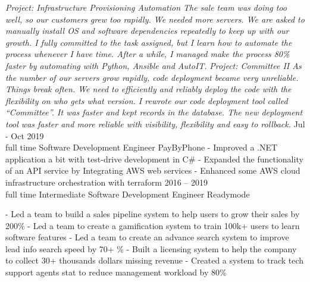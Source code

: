 \documentclass[9pt]{developercv} %
\begin{document}
\begin{entrylist}
{            \textit{Project: Infrastructure Provisioning Automation\newline
            The sale team was doing too well, so our customers grew too rapidly. We needed more servers.  
            We are asked to manually install OS and software dependencies repeatedly to keep up with our growth. I fully committed to the task assigned, but I learn how to automate the process whenever I have time. After a while, I managed make the process 80\% faster by automating with Python, Ansible and AutoIT.\newline\newline}
            \textit{Project: Committee II\newline
            As the number of our servers grow rapidly, code deployment became very unreliable. Things break often. We need to efficiently and reliably deploy the code with the flexibility on who gets what version. I rewrote our code deployment tool called “Committee”. It was faster and kept records in the database. The new deployment tool was faster and more reliable with visibility, flexibility and easy to rollback.\newline}
        }
	\entry
		{Jul - Oct 2019\\\footnotesize{full time}}
		{Software Development Engineer}
		{PayByPhone}
		{
            - Improved a .NET application a bit with test-drive development in C\#\newline
            - Expanded the functionality of an API service by Integrating AWS web services\newline 
            - Enhanced some AWS cloud infrastructure orchestration with terraform\newline
        }
	\entry
		{2016 -- 2019\\\footnotesize{full time}}
		{Intermediate Software Development Engineer}
		{Readymode}
		{
            - Led a team to build a sales pipeline system to help users to grow their sales by 200\%\newline
            - Led a team to create a gamification system to train 100k+ users to learn software features\newline
            - Led a team to create an advance search system to improve lead info search speed by 70+ \%\newline
            - Built a licensing system to help the company to collect 30+ thousands dollars missing revenue\newline
            - Created a system to track tech support agents stat to reduce management workload by 80\%\newline

}
\end{entrylist}
\end{document}
